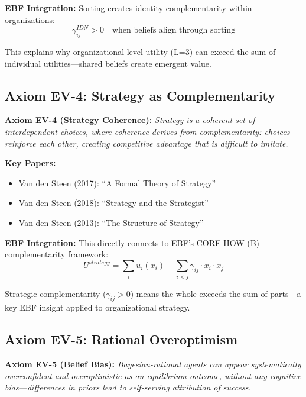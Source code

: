 \textbf{EBF Integration:}
Sorting creates identity complementarity within organizations:
\begin{equation}
\gamma^{IDN}_{ij} > 0 \quad \text{when beliefs align through sorting}
\end{equation}

This explains why organizational-level utility (L=3) can exceed the sum of
individual utilities---shared beliefs create emergent value.

\subsection{Axiom EV-4: Strategy as Complementarity}

\begin{tcolorbox}[colback=blue!5!white, colframe=blue!75!black]
\textbf{Axiom EV-4 (Strategy Coherence):}
\textit{Strategy is a coherent set of interdependent choices, where coherence
derives from complementarity: choices reinforce each other, creating competitive
advantage that is difficult to imitate.}
\end{tcolorbox}

\textbf{Key Papers:}
\begin{itemize}[nosep]
    \item Van den Steen (2017): ``A Formal Theory of Strategy''
    \item Van den Steen (2018): ``Strategy and the Strategist''
    \item Van den Steen (2013): ``The Structure of Strategy''
\end{itemize}

\textbf{EBF Integration:}
This directly connects to EBF's CORE-HOW (B) complementarity framework:
\begin{equation}
U^{strategy} = \sum_i u_i(x_i) + \sum_{i<j} \gamma_{ij} \cdot x_i \cdot x_j
\end{equation}

Strategic complementarity ($\gamma_{ij} > 0$) means the whole exceeds the sum
of parts---a key EBF insight applied to organizational strategy.

\subsection{Axiom EV-5: Rational Overoptimism}

\begin{tcolorbox}[colback=blue!5!white, colframe=blue!75!black]
\textbf{Axiom EV-5 (Belief Bias):}
\textit{Bayesian-rational agents can appear systematically overconfident and
overoptimistic as an equilibrium outcome, without any cognitive bias---differences
in priors lead to self-serving attribution of success.}
\end{tcolorbox}

